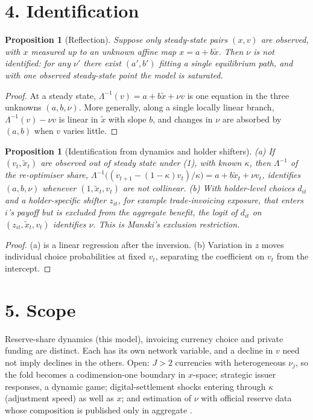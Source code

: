 \documentclass[11pt]{article}
\newtheorem{proposition}[theorem]{Proposition}
\theoremstyle{definition}
\begin{document}
\section*{4. Identification}
\begin{proposition}[Reflection]\label{prop:refl}
Suppose only steady-state pairs $(x,v)$ are observed, with $x$ measured up to an unknown affine map $x=a+b\tilde x$. Then
$\nu$ is not identified: for any $\nu'$ there exist $(a',b')$ fitting a single equilibrium path, and with one observed
steady-state point the model is saturated.
\end{proposition}
\begin{proof}
At a steady state, $\Lambda^{-1}(v)=a+b\tilde x+\nu v$ is one equation in the three unknowns $(a,b,\nu)$. More generally,
along a single locally linear branch, $\Lambda^{-1}(v)-\nu v$ is linear in $\tilde x$ with slope $b$, and changes in $\nu$
are absorbed by $(a,b)$ when $v$ varies little.
\end{proof}
\begin{proposition}[Identification from dynamics and holder shifters]\label{prop:id}
(a) If $(v_t,\tilde x_t)$ are observed out of steady state under (1), with known $\kappa$, then $\Lambda^{-1}$ of the
re-optimiser share, $\Lambda^{-1}\bigl((v_{t+1}-(1-\kappa)v_t)/\kappa\bigr)=a+b\tilde x_t+\nu v_t$, identifies $(a,b,\nu)$
whenever $(1,\tilde x_t,v_t)$ are not collinear.
(b) With holder-level choices $d_{it}$ and a holder-specific shifter $z_{it}$, for example trade-invoicing exposure, that
enters $i$'s payoff but is excluded from the aggregate benefit, the logit of $d_{it}$ on $(z_{it},\tilde x_t,v_t)$ identifies
$\nu$. This is Manski's exclusion restriction.
\end{proposition}
\begin{proof}
(a) is a linear regression after the inversion. (b) Variation in $z$ moves individual choice probabilities at fixed
$v_t$, separating the coefficient on $v_t$ from the intercept.
\end{proof}

\section*{5. Scope}
Reserve-share dynamics (this model), invoicing currency choice and private funding are distinct. Each has its own network
variable, and a decline in $v$ need not imply declines in the others. Open: $J>2$ currencies with heterogeneous $\nu_j$, so
the fold becomes a codimension-one boundary in $x$-space; strategic issuer responses, a dynamic game; digital-settlement
shocks entering through $\kappa$ (adjustment speed) as well as $x$; and estimation of $\nu$ with official reserve data
whose composition is published only in aggregate \cite{boe}.
\end{document}
